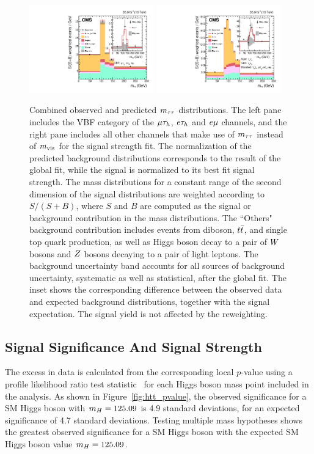 \begin{figure}[htb]
  \centering
    \includegraphics[width=0.48\textwidth]{higgs_to_taus/plots/Figure_019-a.pdf}
    \includegraphics[width=0.48\textwidth]{higgs_to_taus/plots/Figure_019-b.pdf}
   \caption{Combined observed and predicted $m_{\tau\tau}$ distributions. The left pane includes the VBF category of the 
$\mu\tau_{h}$, $e\tau_{h}$ and $e\mu$ channels, and the right pane includes all other channels that make use 
of $m_{\tau\tau}$ instead of $m_\text{vis}$ for the signal strength fit. 
The normalization of the predicted background 
distributions corresponds to the result of the global fit, while the signal is normalized to its best fit 
signal strength. The mass distributions for a constant range of the second dimension of the signal distributions 
are weighted according to $S/(S+B)$, where $S$ and $B$ are computed as the signal or background 
contribution in the mass distributions. The ``Others" background contribution 
includes events from diboson, $t\bar{t}$, and single top quark production, as well as Higgs boson decay to a pair 
of $W$ bosons and $Z$ bosons decaying to a pair of light leptons. The background uncertainty band accounts 
for all sources of background uncertainty, systematic as well as statistical, after the global fit. The inset 
shows the corresponding difference between the observed data and expected background distributions, together 
with the signal expectation. The signal yield is not affected by the reweighting.
}
\label{fig:htt_massweighted}
\end{figure}


\subsection{Signal Significance And Signal Strength}
The excess in data is calculated from the corresponding local $p$-value using a profile likelihood 
ratio test statistic~\cite{LHC-HCG-Report,Chatrchyan:2012tx,Junk,Read:2002hq} for each Higgs boson mass
point included in the analysis.
As shown in Figure~\ref{fig:htt_pvalue}, the observed significance for a SM Higgs boson with $m_{H} = 125.09$\GeV 
is 4.9 standard deviations, for an expected significance of 4.7 standard deviations. Testing multiple mass hypotheses
shows the greatest observed significance for a SM Higgs boson with the expected SM Higgs boson value
$m_{H} = 125.09$\GeV.

